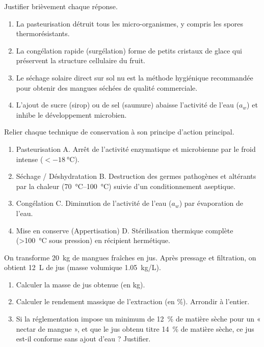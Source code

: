 \documentclass[11pt]{article}
\begin{document}
\begin{exercice}
Justifier brièvement chaque réponse.
\begin{enumerate}
    \item La pasteurisation détruit tous les micro-organismes, y compris les spores thermorésistants.
    \item La congélation rapide (surgélation) forme de petits cristaux de glace qui préservent la structure cellulaire du fruit.
    \item Le séchage solaire direct sur sol nu est la méthode hygiénique recommandée pour obtenir des mangues séchées de qualité commerciale.
    \item L'ajout de sucre (sirop) ou de sel (saumure) abaisse l'activité de l'eau ($a_w$) et inhibe le développement microbien.
\end{enumerate}
\end{exercice}

\begin{exercice}
Relier chaque technique de conservation à son principe d'action principal.
\begin{enumerate}
    \item Pasteurisation \hfill A. Arrêt de l'activité enzymatique et microbienne par le froid intense ($< \SI{-18}{\celsius}$).
    \item Séchage / Déshydratation \hfill B. Destruction des germes pathogènes et altérants par la chaleur (\SI{70}{\celsius}--\SI{100}{\celsius}) suivie d'un conditionnement aseptique.
    \item Congélation \hfill C. Diminution de l'activité de l'eau ($a_w$) par évaporation de l'eau.
    \item Mise en conserve (Appertisation) \hfill D. Stérilisation thermique complète (\SI{>100}{\celsius} sous pression) en récipient hermétique.
\end{enumerate}
\end{exercice}

\begin{exercice}
On transforme \SI{20}{kg} de mangues fraîches en jus. Après pressage et filtration, on obtient \SI{12}{L} de jus (masse volumique \SI{1,05}{kg/L}).
\begin{enumerate}
    \item Calculer la masse de jus obtenue (en kg).
    \item Calculer le rendement massique de l'extraction (en \%). Arrondir à l'entier.
    \item Si la réglementation impose un minimum de \SI{12}{\%} de matière sèche pour un « nectar de mangue », et que le jus obtenu titre \SI{14}{\%} de matière sèche, ce jus est-il conforme sans ajout d'eau ? Justifier.
\end{enumerate}
\end{exercice}
\end{document}

